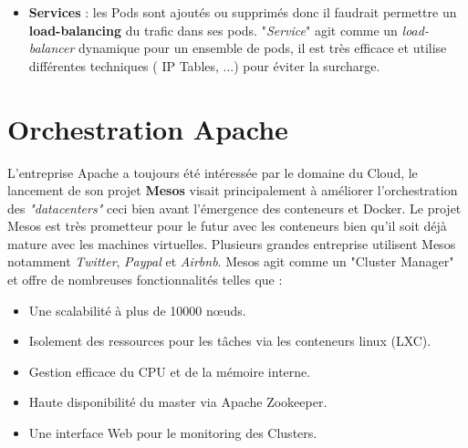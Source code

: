 \begin{onehalfspace}
\begin{itemize}
\item \textbf{Services} : les Pods sont ajoutés ou supprimés donc il faudrait permettre un \textbf{load-balancing} du trafic dans ses pods. "\emph{Service}" agit comme un \emph{load-balancer} dynamique pour un ensemble de pods, il est très efficace et utilise différentes techniques ( IP Tables, ...) pour éviter la surcharge.

\end{itemize}

\section{Orchestration Apache}


L'entreprise Apache a toujours été intéressée par le domaine du Cloud, le lancement de son projet \textbf{Mesos} visait principalement à améliorer l'orchestration des \emph{"datacenters"} ceci bien avant l'émergence des conteneurs et Docker. Le projet Mesos est très prometteur pour le futur avec les conteneurs bien qu'il soit déjà mature avec les machines virtuelles. Plusieurs grandes entreprise utilisent Mesos notamment \emph{Twitter}, \emph{Paypal} et \emph{Airbnb}.
Mesos agit comme un "Cluster Manager" et offre de nombreuses fonctionnalités telles que :
\begin{itemize}
\item Une scalabilité à plus de 10000 nœuds.
\item Isolement des ressources pour les tâches via les conteneurs linux (LXC).
\item Gestion efficace du CPU et de la mémoire interne.
\item Haute disponibilité du master via Apache Zookeeper.
\item Une interface Web pour le monitoring des Clusters.
\end{itemize}

\end{onehalfspace}

